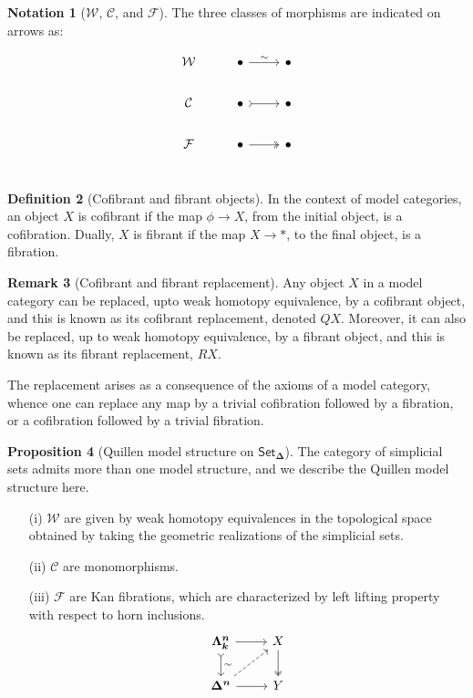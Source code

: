 \documentclass[10pt]{amsart}
\newcommand{\8}{\ensuremath{\infty}}
\newcommand{\0}{\ensuremath{\overset{\rightarrow}{0}}}
\newcommand{\1}{\ensuremath{\mathbf{1}}}
\newcommand{\Simplex}[1]{\ensuremath{\boldsymbol{\Delta^{#1}}}}
\newcommand{\Horn}[2]{\ensuremath{\boldsymbol{\Lambda^{#1}_{#2}}}}
\newcommand{\SSet}{\ensuremath{\mathsf{Set}_{\boldsymbol{\Delta}}}}
\newcommand{\Wcal}{\ensuremath{\mathcal{W}}}
\newcommand{\Ccal}{\ensuremath{\mathcal{C}}}
\newcommand{\Fcal}{\ensuremath{\mathcal{F}}}
\theoremstyle{definition}
\newtheorem{definition}{Definition}[section]
\newtheorem{notation}[definition]{Notation}
\newtheorem{proposition}[definition]{Proposition}
\newtheorem{remark}[definition]{Remark}
\numberwithin{definition}{subsection}
\numberwithin{definition}{section}
\begin{document}
\begin{notation}[\Wcal, \Ccal, and \Fcal]
  The three classes of morphisms are indicated on arrows as:

  \begin{equation*}
    \begin{tikzcd}
      \Wcal & \bullet \arrow[r, "\sim"] & \bullet \\
      \Ccal & \bullet \arrow[r, rightarrowtail] & \bullet \\
      \Fcal & \bullet \arrow[r, twoheadrightarrow] & \bullet \\
    \end{tikzcd}
  \end{equation*}
\end{notation}

\begin{definition}[Cofibrant and fibrant objects]
  In the context of model categories, an object $X$ is cofibrant if the map $\phi \rightarrow X$, from the initial object, is a cofibration. Dually, $X$ is fibrant if the map $X \rightarrow *$, to the final object, is a fibration.
\end{definition}

\begin{remark}[Cofibrant and fibrant replacement]
  Any object $X$ in a model category can be replaced, upto weak homotopy equivalence, by a cofibrant object, and this is known as its cofibrant replacement, denoted $QX$. Moreover, it can also be replaced, up to weak homotopy equivalence, by a fibrant object, and this is known as its fibrant replacement, $RX$.

  The replacement arises as a consequence of the axioms of a model category, whence one can replace any map by a trivial cofibration followed by a fibration, or a cofibration followed by a trivial fibration.
\end{remark}

\begin{proposition}[Quillen model structure on \SSet]
  The category of simplicial sets admits more than one model structure, and we describe the Quillen model structure here.

  \begin{enumerate}
    \item[(i)] $\Wcal$ are given by weak homotopy equivalences in the topological space obtained by taking the geometric realizations of the simplicial sets.
    \item[(ii)] $\Ccal$ are monomorphisms.
    \item[(iii)] $\Fcal$ are Kan fibrations, which are characterized by left lifting property with respect to horn inclusions.
      \begin{equation*}
        \begin{tikzcd}
          \Horn{n}{k} \arrow[d, rightarrowtail, "\sim"] \arrow[r] & X \arrow[d, twoheadrightarrow] \\
          \Simplex{n} \arrow[r] \arrow[ur, dashed] & Y \\
        \end{tikzcd}
      \end{equation*}
  \end{enumerate}
\end{proposition}
\end{document}
